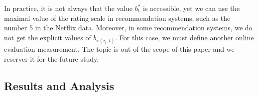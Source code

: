 \documentclass[twoside,leqno,twocolumn]{article}
\begin{document}
In practice, it is not always that the value $b^{*}_{t}$ is accessible, yet we can use the maximal value of the rating scale in recommendation systems, such as the number 5 in the Netflix data. Moreover, in some recommendation systems, we do not get the explicit values of $b_{\pi(i_t,t)}$. For this case, we must define another online evaluation measurement. The topic is out of the scope of this paper and we reserver it for the future study. 

\subsection{Results and Analysis}
\end{document}
